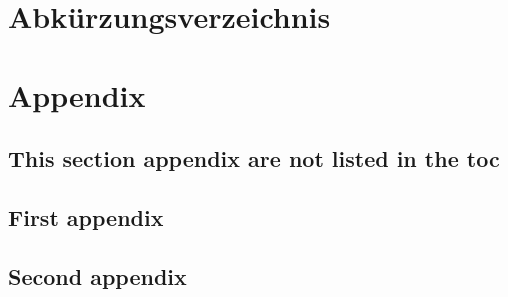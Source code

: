 \documentclass[
	12pt %
	,a4paper %
	,headings=normal %
	,toc=graduated %
]{scrreprt} %
\begin{document}
\chapter*{Abkürzungsverzeichnis}
\begin{acronym}[Abk.] %
\end{acronym}

\newpage
\onehalfspacing %
\renewcommand{\thesection}{\arabic{section}}
\renewcommand{\theHsection}{\arabic{section}}
\setcounter{section}{0}
\setcounter{page}{1}




\appendix
\chapter{Appendix}\label{cha:appendix}
\setcounter{page}{1}

\section*{This section appendix are not listed in the toc}\label{sec:appendixNotInToc}
\section{First appendix}\label{sec:firstAppendix}

\newpage

\section{Second appendix}\label{sec:secondAppendix}
\end{document}
